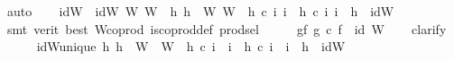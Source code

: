 \begin{isabellebody}
\ auto\isanewline
\isanewline
\ \ \isamarkupfalse%
\ idW{\isacharprime}{\kern0pt}\ \ {\isachardoublequoteopen}idW{\isacharprime}{\kern0pt}{\isacharcolon}{\kern0pt}\ W{\isacharprime}{\kern0pt}{\isasymrightarrow}\ W{\isacharprime}{\kern0pt}{\isasymand}\ {\isacharparenleft}{\kern0pt}{\isasymforall}\ h{}{\isachardot}{\kern0pt}\ {\isacharparenleft}{\kern0pt}h{}\ {\isacharcolon}{\kern0pt}\ W{\isacharprime}{\kern0pt}{\isasymrightarrow}\ W{\isacharprime}{\kern0pt}{\isasymand}\ \ h{}\ {\isasymcirc}\isactrlsub c\ i{\isacharprime}{\kern0pt}\ i{\isacharprime}{\kern0pt}\ {\isasymand}\ h{}\ {\isasymcirc}\isactrlsub c\ i{\isacharprime}{\kern0pt}\ i{\isacharprime}{\kern0pt}\ {\isasymlongrightarrow}\ h{}\ {\isacharequal}{\kern0pt}\ idW{\isacharprime}{\kern0pt}{\isacharparenright}{\kern0pt}{\isachardoublequoteclose}\isanewline
\ \ \ \ \isamarkupfalse%
\ {\isacharparenleft}{\kern0pt}smt\ {\isacharparenleft}{\kern0pt}verit{\isacharcomma}{\kern0pt}\ best{\isacharparenright}{\kern0pt}\ W{\isacharprime}{\kern0pt}{\isacharunderscore}{\kern0pt}coprod\ is{\isacharunderscore}{\kern0pt}coprod{\isacharunderscore}{\kern0pt}def\ prod{\isachardot}{\kern0pt}sel{\isacharparenright}{\kern0pt}\isanewline
\ \ \isamarkupfalse%
\ \isamarkupfalse%
\ gf{\isacharcolon}{\kern0pt}\ {\isachardoublequoteopen}g\ {\isasymcirc}\isactrlsub c\ f\ {\isacharequal}{\kern0pt}\ id\ W{\isacharprime}{\kern0pt}{\isachardoublequoteclose}\isanewline
\ \ \isamarkupfalse%
\ clarify\isanewline
\ \ \ \ \isamarkupfalse%
\ idW{\isacharprime}{\kern0pt}{\isacharunderscore}{\kern0pt}unique{\isacharcolon}{\kern0pt}\ {\isachardoublequoteopen}{\isasymforall}h{}{\isachardot}{\kern0pt}\ h{}\ {\isacharcolon}{\kern0pt}\ W{\isacharprime}{\kern0pt}\ {\isasymrightarrow}\ W{\isacharprime}{\kern0pt}\ {\isasymand}\ h{}\ {\isasymcirc}\isactrlsub c\ i{\isacharprime}{\kern0pt}\ {\isacharequal}{\kern0pt}\ i{\isacharprime}{\kern0pt}\ {\isasymand}\ h{}\ {\isasymcirc}\isactrlsub c\ i{\isacharprime}{\kern0pt}\ {\isacharequal}{\kern0pt}\ i{\isacharprime}{\kern0pt}\ {\isasymlongrightarrow}\ h{}\ {\isacharequal}{\kern0pt}\ idW{\isacharprime}{\kern0pt}{\isachardoublequoteclose}\isanewline

\end{isabellebody}
